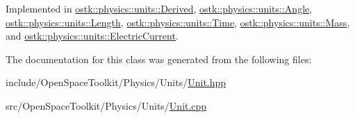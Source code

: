 Implemented in \hyperlink{classostk_1_1physics_1_1units_1_1_derived_ac1794677978fba5582fb127e032f7398}{ostk\+::physics\+::units\+::\+Derived}, \hyperlink{classostk_1_1physics_1_1units_1_1_angle_a7403146e01d293dfdd30130f9a9f0f2f}{ostk\+::physics\+::units\+::\+Angle}, \hyperlink{classostk_1_1physics_1_1units_1_1_length_ad3ec518939d2ffc86cd73b8ed4c071af}{ostk\+::physics\+::units\+::\+Length}, \hyperlink{classostk_1_1physics_1_1units_1_1_time_a6805d7d9b298d1ba9f219294e11a363c}{ostk\+::physics\+::units\+::\+Time}, \hyperlink{classostk_1_1physics_1_1units_1_1_mass_aa8993fb7d2dbed494bbb68f8ec002af5}{ostk\+::physics\+::units\+::\+Mass}, and \hyperlink{classostk_1_1physics_1_1units_1_1_electric_current_aa720f442c93f18f81ad769edbd570bd5}{ostk\+::physics\+::units\+::\+Electric\+Current}.



The documentation for this class was generated from the following files\+:\begin{DoxyCompactItemize}
\item 
include/\+Open\+Space\+Toolkit/\+Physics/\+Units/\hyperlink{_units_2_unit_8hpp}{Unit.\+hpp}\item 
src/\+Open\+Space\+Toolkit/\+Physics/\+Units/\hyperlink{_units_2_unit_8cpp}{Unit.\+cpp}\end{DoxyCompactItemize}
